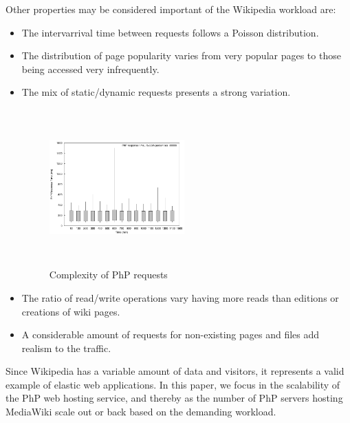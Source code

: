 Other properties may be considered important of the Wikipedia workload are:

\begin{itemize}
\item The intervarrival time between requests follows a Poisson distribution.

\item The distribution of page popularity varies from very popular pages to those being accessed very infrequently.

\item The mix of static/dynamic requests presents a strong variation. 

\begin{figure}
\begin{center}
\includegraphics[width=0.49\textwidth, height=6cm]{./images/phpRespTimeDispersion}
\end{center}
\caption{Complexity of PhP requests}
\label{phpRespTimeDispersion}
\end{figure}

\item The ratio of read/write operations vary having more reads than editions or creations of wiki pages.

\item A considerable amount of requests for non-existing pages and files add realism to the traffic.

\end{itemize}




Since Wikipedia has a variable amount of data and visitors, it represents a valid example of elastic web applications. In this paper, we focus in the scalability of the PhP web hosting service, and thereby as the number of PhP servers hosting MediaWiki scale out or back based on the demanding workload.

